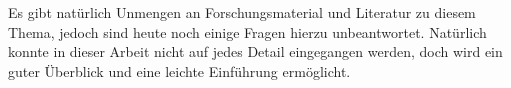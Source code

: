 \documentclass[12pt,a4paper]{article}
\theoremstyle{definition}
\begin{document}
Es gibt natürlich Unmengen an Forschungsmaterial und Literatur zu diesem Thema, jedoch sind heute noch einige Fragen hierzu unbeantwortet.
Natürlich konnte in dieser Arbeit nicht auf jedes Detail eingegangen werden, doch wird ein guter Überblick und eine leichte Einführung ermöglicht.

\newpage
\section*{}
\printbibliography

\newpage
\listoftables
{}

\listoffigures
{}
\end{document}
